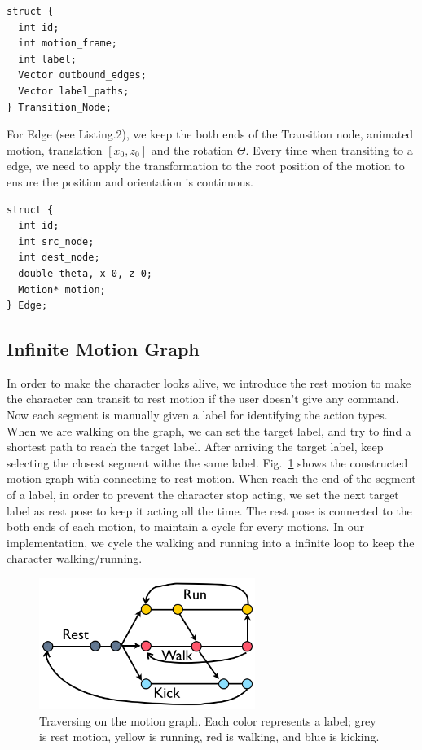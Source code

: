 \begin{lstlisting}[label=transition_node_code,caption=Data structure of Transition Node]
struct {
  int id;
  int motion_frame;
  int label;
  Vector outbound_edges;
  Vector label_paths;
} Transition_Node;
\end{lstlisting}

For Edge (see Listing.2), we keep the both ends of the Transition node, animated motion, translation $[x_0, z_0]$ and the rotation 
$\Theta$. Every time when transiting to a edge, we need to apply the 
transformation to the root position of the motion to ensure the position and 
orientation is continuous. 

\begin{lstlisting}[label=edge_code,caption=Data structure of Edge]
struct {
  int id;
  int src_node;
  int dest_node;
  double theta, x_0, z_0;
  Motion* motion;
} Edge;
\end{lstlisting}


\subsection{Infinite Motion Graph}
In order to make the character looks alive, we introduce the rest motion to make 
the character can transit to rest motion if the user doesn't give any command.
Now each segment is manually given a label for identifying the action types.
When we are walking on the graph, we can set the target label, and try to find 
a shortest path to reach the target label. After arriving the target label, 
keep selecting the closest segment withe the same label. 
Fig.~\ref{fig:graph} shows the constructed motion graph with connecting to rest motion. 
When reach the end of the segment of a label, in order to prevent the character 
stop acting, we set the next target label as rest pose to keep it acting all the 
time. The rest pose is connected to the both ends of each motion, to maintain 
a cycle for every motions. In our implementation, we cycle the walking and running into a infinite loop to 
keep the character walking/running. 


\begin{figure}
\centering
\includegraphics [width=70mm] {Images/graph} 
\caption{Traversing on the motion graph. Each color represents a label; grey is rest motion, yellow is running, red is walking, and blue is kicking. }
\label{fig:graph}
\end{figure}
